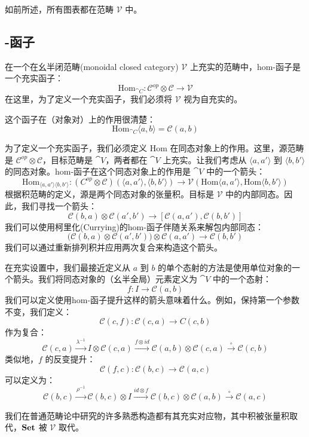 \documentclass[DaoFP]{subfiles}
\begin{document}
如前所述，所有图表都在范畴 $\mathcal V$ 中。

\subsection{-函子}

在一个在幺半闭范畴(monoidal closed category) $\mathcal V$ 上充实的范畴中，hom-函子是一个充实函子：
\[ \text{Hom}_{\cat C} \colon \mathcal C^{op} \otimes \mathcal C \to \mathcal V \]
在这里，为了定义一个充实函子，我们必须将 $\mathcal V$ 视为自充实的。

这个函子在（对象对）上的作用很清楚：
\[ \text{Hom}_{\cat C} \langle a, b \rangle = \mathcal C (a, b) \]

为了定义一个充实函子，我们必须定义 $\text{Hom}$ 在同态对象上的作用。这里，源范畴是 $\mathcal C^{op} \otimes \mathcal C$，目标范畴是 $\cat V$，两者都在 $\cat V$ 上充实。让我们考虑从 $\langle a, a' \rangle$ 到 $\langle b, b' \rangle$ 的同态对象。hom-函子在这个同态对象上的作用是 $\cat V$ 中的一个箭头：
\[ \text{Hom}_{\langle a, a' \rangle \langle b, b' \rangle} \colon (C^{op} \otimes \mathcal C)(\langle a, a' \rangle, \langle b, b' \rangle) \to \mathcal V (\text{Hom}\langle a, a' \rangle, \text{Hom}\langle b, b' \rangle)\]
根据积范畴的定义，源是两个同态对象的张量积。目标是 $\mathcal V$ 中的内部同态。因此，我们寻找一个箭头：
\[ \mathcal C(b, a) \otimes \mathcal C(a', b') \to [\mathcal C(a, a'), \mathcal C(b, b')] \]
我们可以使用柯里化(Currying)的hom-函子伴随关系来解包内部同态：
\[ \Big( \mathcal C(b, a) \otimes \mathcal C(a', b') \Big) \otimes \mathcal C(a, a') \to \mathcal C(b, b') \]
我们可以通过重新排列积并应用两次复合来构造这个箭头。

在充实设置中，我们最接近定义从 $a$ 到 $b$ 的单个态射的方法是使用单位对象的一个箭头。我们将同态对象的（幺半全局）元素定义为 $\cat V$ 中的一个态射：
\[ f \colon I \to \mathcal C(a, b) \]
我们可以定义使用hom-函子提升这样的箭头意味着什么。例如，保持第一个参数不变，我们定义：
\[ \mathcal C(c, f) \colon \mathcal C(c, a) \to C(c, b) \] 
作为复合：
\[ \mathcal C(c, a) \xrightarrow{\lambda^{-1}} I \otimes \mathcal C(c, a) \xrightarrow{f \otimes id} \mathcal C(a, b) \otimes \mathcal C(c, a) \xrightarrow{\circ} \mathcal C(c, b) \]
类似地，$f$ 的反变提升：
\[ \mathcal C(f, c) \colon \mathcal C(b, c) \to \mathcal C(a, c) \]
可以定义为：
\[ \mathcal C(b, c) \xrightarrow{\rho^{-1}} \mathcal C(b, c) \otimes I \xrightarrow{id \otimes f} \mathcal C (b, c) \otimes \mathcal C(a, b) \xrightarrow{\circ} \mathcal C(a, c) \]

我们在普通范畴论中研究的许多熟悉构造都有其充实对应物，其中积被张量积取代，$\mathbf{Set}$ 被 $\mathcal V$ 取代。
\end{document}
